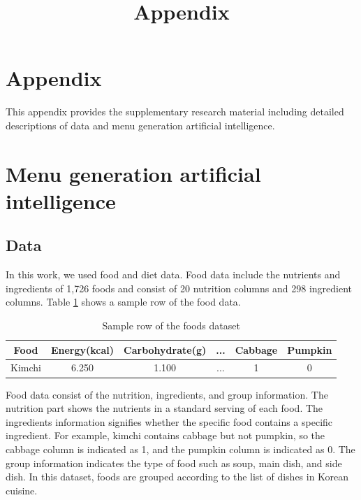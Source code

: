 \documentclass{article}
\title{Appendix}
\begin{document}
\section*{\hfil Appendix \hfil}

This appendix provides the supplementary research material including detailed descriptions of data and menu generation artificial intelligence.

\section{Menu generation artificial intelligence}
\subsection{Data}
In this work, we used food and diet data. Food data include the nutrients and ingredients of 1,726 foods and consist of 20 nutrition columns and 298 ingredient columns. Table \ref{table: table1} shows a sample row of the food data.

\begin{table}[ht]
\begin{tabular}{|c|c|c|c|c|c|}
\hline
\textbf{Food}   & \textbf{Energy(kcal)} & \textbf{Carbohydrate(g)} & ... & \textbf{Cabbage} & \textbf{Pumpkin} \\ \hline
Kimchi & 6.250  & 1.100        & ... & 1       & 0       \\ \hline
\end{tabular}
\caption{Sample row of the foods dataset}
\label{table: table1}
\end{table}

Food data consist of the nutrition, ingredients, and group information. The nutrition part shows the nutrients in a standard serving of each food. The ingredients information signifies whether the specific food contains a specific ingredient. For example, kimchi contains cabbage but not pumpkin, so the cabbage column is indicated as 1, and the pumpkin column is indicated as 0. The group information indicates the type of food such as soup, main dish, and side dish. In this dataset, foods are grouped according to the list of dishes in Korean cuisine.
\end{document}
